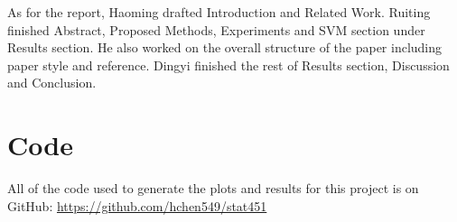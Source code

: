 \documentclass[10pt,twocolumn,letterpaper]{article}
\begin{document}
	As for the report, Haoming drafted Introduction and Related Work. Ruiting finished Abstract, Proposed Methods, Experiments and SVM section under Results section. He also worked on the overall structure of the paper including paper style and reference. Dingyi finished the rest of Results section, Discussion and Conclusion.
	\section{Code}
	All of the code used to generate the plots and results for this project is on GitHub: \url{https://github.com/hchen549/stat451}
	
		
	
\end{document}
